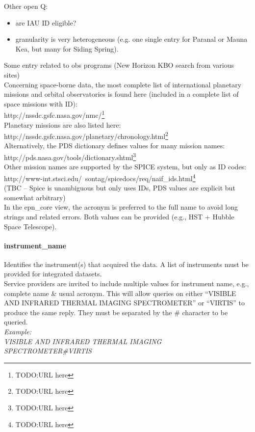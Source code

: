 \documentclass[11pt,a4paper]{ivoa}
\begin{document}
Other open Q:

\begin{itemize}
\item are IAU ID eligible?
\item granularity is very heterogeneous (e.g. one single entry for Paranal or Mauna Kea, but many for Siding Spring).
\end{itemize}

Some entry related to obs programs (New Horizon KBO search from various sites) \\ Concerning space-borne data, the most complete list of international planetary missions and orbital observatories is found here (included in a complete list of space missions with ID):\\ http://nssdc.gsfc.nasa.gov/nmc/\footnote{TODO:URL here}\\ Planetary missions are also listed here:\\ http://nssdc.gsfc.nasa.gov/planetary/chronology.html\footnote{TODO:URL here} \\ Alternatively, the PDS dictionary defines values for many mission names:\\ http://pds.nasa.gov/tools/dictionary.shtml\footnote{TODO:URL here}\\ Other mission names are supported by the SPICE system, but only as ID codes:\\ http://www-int.stsci.edu/~sontag/spicedocs/req/naif\_ids.html\footnote{TODO:URL here}\\ (TBC – Spice is unambiguous but only uses IDs, PDS values are explicit but somewhat arbitrary)\\ In the epn\_core view, the acronym is preferred to the full name to avoid long strings and related errors. Both values can be provided (e.g., HST + Hubble Space Telescope).

\paragraph{instrument\_name}

Identifies the instrument(s) that acquired the data. A list of instruments must be provided for integrated datasets. \\ Service providers are invited to include multiple values for instrument name, e.g., complete name \& usual acronym. This will allow queries on either ``VISIBLE AND INFRARED THERMAL IMAGING SPECTROMETER'' or ``VIRTIS'' to produce the same reply. They must be separated by the \# character to be queried.\\\emph{\emph{Example:}}\\\emph{VISIBLE AND INFRARED THERMAL IMAGING SPECTROMETER\#VIRTIS}
\end{document}

